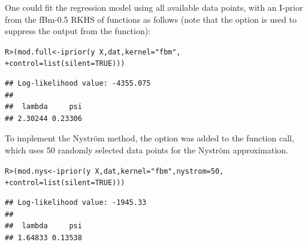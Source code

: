\documentclass[showframe,11pt]{report}\usepackage[]{graphicx}\usepackage[]{color}
\makeatletter
\newcommand{\hlnum}[1]{\textcolor[rgb]{0.063,0.58,0.627}{#1}}%
\newcommand{\hlstr}[1]{\textcolor[rgb]{0.063,0.58,0.627}{#1}}%
\newcommand{\hlopt}[1]{\textcolor[rgb]{0.196,0.196,0.196}{#1}}%
\newcommand{\hlstd}[1]{\textcolor[rgb]{0.196,0.196,0.196}{#1}}%
\newcommand{\hlkwb}[1]{\textcolor[rgb]{0.627,0,0.314}{#1}}%
\newcommand{\hlkwc}[1]{\textcolor[rgb]{0,0.631,0.314}{#1}}%
\newcommand{\hlkwd}[1]{\textcolor[rgb]{0.78,0.227,0.412}{#1}}%
\newenvironment{kframe}{%
 \def\at@end@of@kframe{}%
 \ifinner\ifhmode%
  \def\at@end@of@kframe{\end{minipage}}%
  \begin{minipage}{\columnwidth}%
 \fi\fi%
 \def\FrameCommand##1{\hskip\@totalleftmargin \hskip-\fboxsep
 \colorbox{shadecolor}{##1}\hskip-\fboxsep
     \hskip-\linewidth \hskip-\@totalleftmargin \hskip\columnwidth}%
 \MakeFramed {\advance\hsize-\width
   \@totalleftmargin\z@ \linewidth\hsize
   \@setminipage}}%
 {\par\unskip\endMakeFramed%
 \at@end@of@kframe}
\newenvironment{knitrout}{}{} %
\makeatother
\begin{document}
One could fit the regression model using all available data points, with an I-prior from the fBm-0.5 RKHS of functions as follows (note that the  option is used to suppress the output from the  function):

\begin{knitrout}
\color{fgcolor}\begin{kframe}
\begin{alltt}
\hlstd{R> }\hlstd{(mod.full} \hlkwb{<-} \hlkwd{iprior}\hlstd{(y} \hlopt{~} \hlstd{X, dat,} \hlkwc{kernel} \hlstd{=} \hlstr{"fbm"}\hlstd{,}
\hlstd{+  }                    \hlkwc{control} \hlstd{=} \hlkwd{list}\hlstd{(}\hlkwc{silent} \hlstd{=} \hlnum{TRUE}\hlstd{)))}
\end{alltt}
\begin{verbatim}
## Log-likelihood value: -4355.075 
## 
##  lambda     psi 
## 2.30244 0.23306
\end{verbatim}
\end{kframe}
\end{knitrout}

To implement the Nystr\"om method, the option  was added to the function call, which uses 50 randomly selected data points for the Nystr\"om approximation.

\begin{knitrout}
\color{fgcolor}\begin{kframe}
\begin{alltt}
\hlstd{R> }\hlstd{(mod.nys} \hlkwb{<-} \hlkwd{iprior}\hlstd{(y} \hlopt{~} \hlstd{X, dat,} \hlkwc{kernel} \hlstd{=} \hlstr{"fbm"}\hlstd{,} \hlkwc{nystrom} \hlstd{=} \hlnum{50}\hlstd{,}
\hlstd{+  }                   \hlkwc{control} \hlstd{=} \hlkwd{list}\hlstd{(}\hlkwc{silent} \hlstd{=} \hlnum{TRUE}\hlstd{)))}
\end{alltt}
\begin{verbatim}
## Log-likelihood value: -1945.33 
## 
##  lambda     psi 
## 1.64833 0.13538
\end{verbatim}
\end{kframe}
\end{knitrout}
\end{document}
